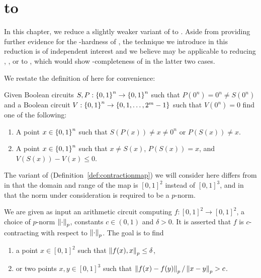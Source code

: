 \chapter{\TwoDContractionMap to \EOPL}
\label{sec:twoDContractionMapToEOPL}
In this chapter, we reduce a slightly weaker variant of \CM to \EOPL. Aside from providing further evidence for the \CLS-hardness of \EOPL, the technique we introduce in this reduction is of independent interest and we believe may be applicable to reducing \CM, \MMCM, or \MBanach to \EOPL, which would show \CLS-completeness of \EOPL in the latter two cases.

We restate the definition of \EOPL here for convenience:

\begin{definition}[\EOPL]
\label{def:EOPL2}
Given Boolean circuits $S,P : \left\{ 0,1 \right\}^n \to \left\{ 0,1 \right\}^n$ such that $P(0^n) =0^n\neq S(0^n)$ and a Boolean circuit $V: \left\{ 0,1 \right\}^n \to \left\{ 0,1,\dotsc,2^m - 1 \right\}$ such that $V(0^n) = 0$ find one of the following:
\begin{enumerate}[label=(R\arabic*)]
\item A point $x \in \left\{ 0,1 \right\}^n$ such that $S(P(x)) \neq x \neq 0^n$ or $P(S(x)) \neq x$. \label{eopl2:eol}
\item A point $x \in \left\{ 0,1 \right\}^n$ such that $x \neq S(x)$, $P(S(x)) = x$, and $V(S(x)) - V(x) \leq 0$. \label{eopl2:bad_potential}
\end{enumerate}
\end{definition}


The variant of \CM (Definition~\ref{def:contractionmap}) we will consider here differs from \CM in that the domain and range of the map is $[0,1]^2$ instead of $[0,1]^3$, and in that the norm under consideration is required to be a $p$-norm.
\begin{definition}[\TwoDContractionMap] 
  \label{def:2DContractionMap}
We are given as input an arithmetic circuit computing $f: [0,1]^2\to [0,1]^2$,
a choice of $p$-norm $\left\| \cdot \right\|_p$, constants \mbox{$c \in (0,1)$}
and $\delta > 0$. It is asserted that $f$ is $c$-contracting with respect to $\left\| \cdot \right\|_p$.
The goal is to find
\begin{enumerate}[label=(E\arabic*)]
\item a point $x\in [0,1]^2$ such that $\left\| f(x),x \right\|_p \leq \delta$, \label{2dcm:fixpoint}
\item or two points $x,y\in [0,1]^3$ such that $\left\| f(x) - f(y) \right\|_p/\left\| x-y \right\|_p > c$. \label{2dcm:violation}
\end{enumerate}
\end{definition}

